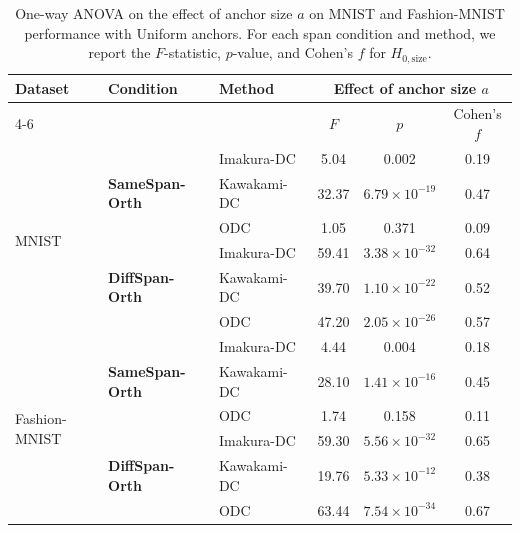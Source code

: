 \documentclass[final,3p,times]{elsarticle}
\theoremstyle{plain}
\begin{document}
\begin{table}[t]
  \centering
  \caption{One-way ANOVA on the effect of anchor size $a$ on MNIST and Fashion-MNIST performance
  with Uniform anchors. For each span condition and method, we report the
  $F$-statistic, $p$-value, and Cohen's $f$ for $H_{0,\text{size}}$.}
  \label{tab:anova-image}
  \begin{tabular}{lllccc}
    \toprule
    \multirow{2}{*}{Dataset} & \multirow{2}{*}{Condition} & \multirow{2}{*}{Method} & \multicolumn{3}{c}{Effect of anchor size $a$} \\
    \cmidrule(lr){4-6}
    & & & {$F$} & {$p$} & {Cohen's $f$} \\
    \midrule
    \multirow{6}{*}{MNIST}
      & \multirow{3}{*}{\textbf{SameSpan-Orth}}
        & Imakura-DC~\cite{DCframework1}   & 5.04   & 0.002    & 0.19  \\
      &  & Kawakami-DC~\cite{KawakamiDC} & 32.37  & $6.79 \times 10^{-19}$ & 0.47  \\
      &  & ODC  & 1.05   & 0.371    & 0.09  \\
    \cmidrule(lr){2-6}
      & \multirow{3}{*}{\textbf{DiffSpan-Orth}}
        & Imakura-DC~\cite{DCframework1}   & 59.41  & $3.38 \times 10^{-32}$ & 0.64  \\
      &  & Kawakami-DC~\cite{KawakamiDC} & 39.70  & $1.10 \times 10^{-22}$ & 0.52  \\
      &  & ODC  & 47.20  & $2.05 \times 10^{-26}$ & 0.57  \\
    \midrule
    \multirow{6}{*}{Fashion-MNIST}
      & \multirow{3}{*}{\textbf{SameSpan-Orth}}
        & Imakura-DC~\cite{DCframework1}   & 4.44   & 0.004    & 0.18  \\
      &  & Kawakami-DC~\cite{KawakamiDC} & 28.10  & $1.41 \times 10^{-16}$ & 0.45  \\
      &  & ODC  & 1.74   & 0.158    & 0.11  \\
    \cmidrule(lr){2-6}
      & \multirow{3}{*}{\textbf{DiffSpan-Orth}}
        & Imakura-DC~\cite{DCframework1}   & 59.30  & $5.56 \times 10^{-32}$ & 0.65  \\
      &  & Kawakami-DC~\cite{KawakamiDC} & 19.76  & $5.33 \times 10^{-12}$ & 0.38  \\
      &  & ODC  & 63.44  & $7.54 \times 10^{-34}$ & 0.67  \\
    \bottomrule
  \end{tabular}
\end{table}
\end{document}
